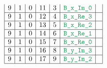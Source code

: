\begin{figure}[h!]
\begin{adjustwidth}{-2cm}{-2cm}
{\[\begin{array}{|c|c|c|c|c|c|c|}
                    9                      & 1                                            & 0                                              & 11                     & 3                   & \locBXImZero         &                                                                                                                                                                       \\ \hline
                    9                      & 1                                            & 0                                              & 12                     & 4                   & \locBXReThree        &                                                                                                                                                                       \\ \hline
                    9                      & 1                                            & 0                                              & 13                     & 5                   & \locBXReTwo          &                                                                                                                                                                       \\ \hline
                    9                      & 1                                            & 0                                              & 14                     & 6                   & \locBXReOne          &                                                                                                                                                                       \\ \hline
                    9                      & 1                                            & 0                                              & 15                     & 7                   & \locBXReZero         &                                                                                                                                                                       \\ \hline
                    9                      & 1                                            & 0                                              & 16                     & 8                   & \locBYImThree        &                                                                                                                                                                       \\ \hline
                    9                      & 1                                            & 0                                              & 17                     & 9                   & \locBYImTwo          &                                                                                                                                                                       \\ \hline

\end{array}\]}
\end{adjustwidth}
\end{figure}
